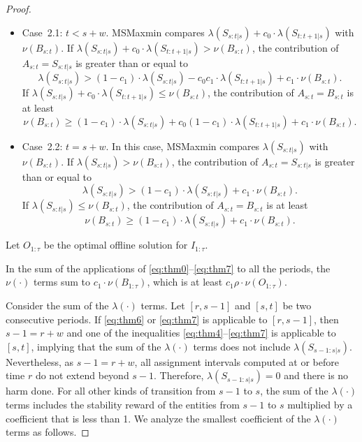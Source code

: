\documentclass[11pt,a4paper]{article}
\renewcommand{\leq}{\leqslant}
\renewcommand{\geq}{\geqslant}
\begin{document}
\begin{proof}
\begin{itemize}
	\begin{itemize}
		\item Case~2.1: $t < s+w$.   MSMaxmin compares $\lambda(S_{s:t|s}) + c_0\cdot\lambda(S_{t:t+1|s})$ with $\nu(B_{s:t})$.  If $\lambda(S_{s:t|s}) + c_0\cdot\lambda(S_{t:t+1|s}) > \nu(B_{s:t})$, the contribution of $A_{s:t} = S_{s:t|s}$ is greater than or equal to
		\begin{equation} 
			\lambda(S_{s:t|s}) > (1-c_1)\cdot\lambda(S_{s:t|s}) - c_0c_1\cdot\lambda(S_{t:t+1|s}) + c_1\cdot\nu(B_{s:t}).    \label{eq:thm4}
		\end{equation}
		If $\lambda(S_{s:t|s}) + c_0\cdot\lambda(S_{t:t+1|s}) \leq \nu(B_{s:t})$, the contribution of $A_{s:t} = B_{s:t}$ is at least 
		\begin{equation}
			\nu(B_{s:t}) \geq (1-c_1)\cdot\lambda(S_{s:t|s}) + c_0(1-c_1)\cdot\lambda(S_{t:t+1|s}) + c_1\cdot\nu(B_{s:t}).    \label{eq:thm5}
		\end{equation}

		\item Case~2.2: $t = s+w$.  In this case, MSMaxmin compares $\lambda(S_{s:t|s})$ with $\nu(B_{s:t})$.  If $\lambda(S_{s:t|s}) > \nu(B_{s:t})$, the contribution of $A_{s:t} = S_{s:t|s}$ is greater than or equal to
		\begin{equation} 
			\lambda(S_{s:t|s}) > (1-c_1)\cdot\lambda(S_{s:t|s}) + c_1\cdot\nu(B_{s:t}).    \label{eq:thm6}
		\end{equation}
		If $\lambda(S_{s:t|s}) \leq \nu(B_{s:t})$, the contribution of $A_{s:t} = B_{s:t}$ is at least 
		\begin{equation}
			\nu(B_{s:t}) \geq (1-c_1)\cdot\lambda(S_{s:t|s}) + c_1\cdot\nu(B_{s:t}).    \label{eq:thm7}
		\end{equation}
	\end{itemize}
\end{itemize}

Let $O_{1:\tau}$ be the optimal offline solution for $I_{1:\tau}$.

In the sum of the applications of \eqref{eq:thm0}--\eqref{eq:thm7} to all the periods, the $\nu(\cdot)$ terms sum to $c_1\cdot\nu(B_{1:\tau})$, which is at least $c_1\rho\cdot\nu(O_{1:\tau})$.

Consider the sum of the $\lambda(\cdot)$ terms.  Let $[r,s-1]$ and $[s,t]$ be two consecutive periods.  If \eqref{eq:thm6} or \eqref{eq:thm7} is applicable to $[r,s-1]$, then $s-1 = r+w$ and one of the inequalities \eqref{eq:thm4}--\eqref{eq:thm7} is applicable to $[s,t]$, implying that the sum of the $\lambda(\cdot)$ terms does not include $\lambda(S_{s-1:s|s})$.  Nevertheless, as $s-1 = r+w$, all assignment intervals computed at or before time $r$ do not extend beyond $s-1$.  Therefore, $\lambda(S_{s-1:s|s}) = 0$ and there is no harm done.  For all other kinds of transition from $s-1$ to $s$, the sum of the $\lambda(\cdot)$ terms includes the stability reward of the entities from $s-1$ to $s$ multiplied by a coefficient that is less than 1.  We analyze the smallest coefficient of the $\lambda(\cdot)$ terms as follows.


\end{proof}
\end{document}
